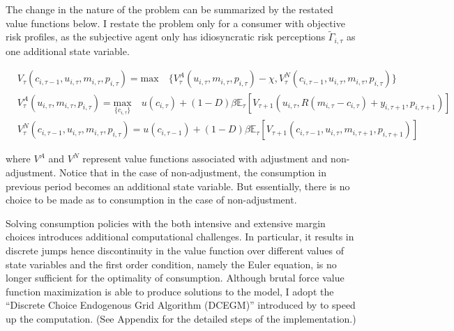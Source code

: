 The change in the nature of the problem can be summarized by the restated value functions below. I restate the problem only for a consumer with objective risk profiles, as the subjective agent only has idiosyncratic risk perceptions $\tilde \Gamma_{i,\tau}$ as one additional state variable. 

\begin{equation}
\begin{split}
& V_{\tau}(c_{i,\tau-1},u_{i,\tau}, m_{i,\tau}, p_{i,\tau}) = \textrm{max} \quad \{V^A_{\tau}(u_{i,\tau}, m_{i,\tau}, p_{i,\tau})-\chi,V^N_{\tau}(c_{i,\tau-1},u_{i,\tau}, m_{i,\tau}, p_{i,\tau})\} \\
& V^A_{\tau}(u_{i,\tau}, m_{i,\tau}, p_{i,\tau}) = \underset{\{c_{i,\tau}\}}{\textrm{max}} \quad u(c_{i,\tau}) + (1-D)\beta \mathbb{E}_{\tau}\left[V_{\tau+1}(u_{i,\tau},R(m_{i,\tau}-c_{i,\tau})+y_{i,\tau+1}, p_{i,\tau+1})\right]  \\
& V^N_{\tau}(c_{i,\tau-1},u_{i,\tau}, m_{i,\tau}, p_{i,\tau}) =  u(c_{i,\tau-1}) + (1-D)\beta \mathbb{E}_{\tau}\left[V_{\tau+1}(c_{i,\tau-1},u_{i,\tau},m_{i,\tau+1}, p_{i,\tau+1})\right]
\end{split}
\end{equation}

where $V^A$ and $V^N$ represent value functions associated with adjustment and non-adjustment. Notice that in the case of non-adjustment, the consumption in previous period becomes an additional state variable. But essentially, there is no choice to be made as to consumption in the case of non-adjustment. 

Solving consumption policies with the both intensive and extensive margin choices introduces additional computational challenges. In particular, it results in discrete jumps hence discontinuity in the value function over different values of state variables and the first order condition, namely the Euler equation, is no longer sufficient for the optimality of consumption. Although brutal force value function maximization is able to produce solutions to the model, I adopt the ``Discrete Choice Endogenous Grid Algorithm (DCEGM)'' introduced by \cite{iskhakov2017endogenous} to speed up the computation. (See Appendix for the detailed steps of the implementation.)


